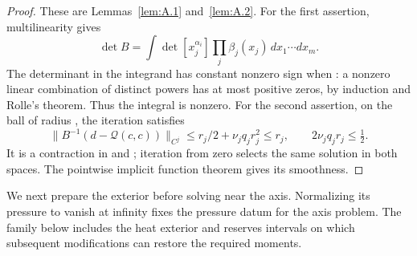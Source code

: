 \begin{proof}
These are Lemmas~\ref{lem:A.1} and~\ref{lem:A.2}. For the first assertion, multilinearity gives
\[
  \det B=\int\det[x_j^{\alpha_i}]\prod_j\beta_j(x_j)\,dx_1\cdots dx_m.
\]
The determinant in the integrand has constant nonzero sign when : a nonzero linear combination of  distinct powers has at most  positive zeros, by induction and Rolle's theorem. Thus the integral is nonzero. For the second assertion, on the ball of radius , the iteration  satisfies
\[
  \|B^{-1}(d-\mathcal Q(c,c))\|_{C^j}\leq r_j/2+\nu_jq_jr_j^2\leq r_j,
  \qquad 2\nu_jq_jr_j\leq\tfrac12.
\]
%
It is a contraction in  and ; iteration from zero selects the same solution in both spaces. The pointwise implicit function theorem gives its smoothness.
\end{proof}

We next prepare the exterior before solving near the axis. Normalizing its pressure to vanish at infinity fixes the pressure datum for the axis problem. The family below includes the heat exterior and reserves intervals on which subsequent modifications can restore the required moments.

